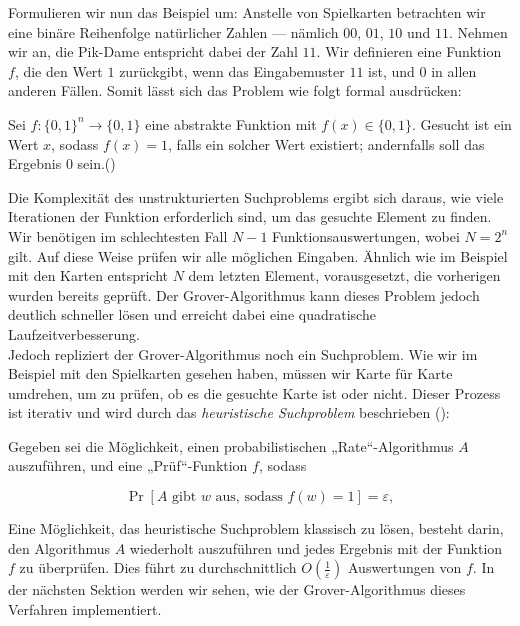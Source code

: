 Formulieren wir nun das Beispiel um: Anstelle von Spielkarten betrachten wir eine binäre Reihenfolge natürlicher Zahlen — nämlich $00$, $01$, $10$ und $11$. Nehmen wir an, die Pik-Dame entspricht dabei der Zahl $11$. Wir definieren eine Funktion $f$, die den Wert $1$ zurückgibt, wenn das Eingabemuster $11$ ist, und $0$ in allen anderen Fällen. Somit lässt sich das Problem wie folgt formal ausdrücken:

\begin{definition}
Sei $f\colon \{0, 1\}^n \rightarrow \{0, 1\}$ eine abstrakte Funktion mit $f(x) \in \{0, 1\}$. Gesucht ist ein Wert $x$, sodass $f(x) = 1$, falls ein solcher Wert existiert; andernfalls soll das Ergebnis $0$ sein.(\cite{montanaro_quantum_2016})
\end{definition}

Die Komplexität des unstrukturierten Suchproblems ergibt sich daraus, wie viele Iterationen der Funktion erforderlich sind, um das gesuchte Element zu finden. Wir benötigen im schlechtesten Fall $N - 1$ Funktionsauswertungen, wobei $N = 2^n$ gilt. Auf diese Weise prüfen wir alle möglichen Eingaben. Ähnlich wie im Beispiel mit den Karten entspricht $N$ dem letzten Element, vorausgesetzt, die vorherigen wurden bereits geprüft. Der Grover-Algorithmus kann dieses Problem jedoch deutlich schneller lösen und erreicht dabei eine quadratische Laufzeitverbesserung.\\

Jedoch repliziert der Grover-Algorithmus noch ein Suchproblem. Wie wir im Beispiel mit den Spielkarten gesehen haben, müssen wir Karte für Karte umdrehen, um zu prüfen, ob es die gesuchte Karte ist oder nicht. Dieser Prozess ist iterativ und wird durch das \textit{heuristische Suchproblem} beschrieben (\cite{montanaro_quantum_2016}):

\begin{definition}
Gegeben sei die Möglichkeit, einen probabilistischen „Rate“-Algorithmus \( A \) auszuführen, und eine „Prüf“-Funktion \( f \), sodass

\[
\Pr\left[ A \text{ gibt } w \text{ aus, sodass } f(w) = 1 \right] = \varepsilon,
\]
\end{definition}

Eine Möglichkeit, das heuristische Suchproblem klassisch zu lösen, besteht darin, den Algorithmus \( A \) wiederholt auszuführen und jedes Ergebnis mit der Funktion \( f \) zu überprüfen. Dies führt zu durchschnittlich \( O\left(\frac{1}{\varepsilon}\right) \) Auswertungen von \( f \). In der nächsten Sektion werden wir sehen, wie der Grover-Algorithmus dieses Verfahren implementiert.

